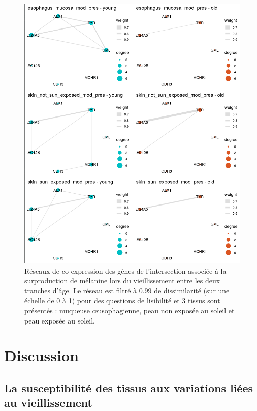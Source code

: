 \begin{figure}[p]
    \centering
    \includegraphics[width=1\textwidth]{img/chap2/chap2_graphs_intersection_melanine.png}
    \caption{Réseaux de co-expression des gènes de l'intersection associée à la surproduction de mélanine lors du vieillissement entre les deux tranches d'âge. Le réseau est filtré à 0.99 de dissimilarité (sur une échelle de 0 à 1) pour des questions de lisibilité et 3 tissus sont présentés : muqueuse œusophagienne, peau non exposée au soleil et peau exposée au soleil.}
    \label{figure:graphs_intersection_melanine}
\end{figure}


\section{Discussion}

\subsection{La susceptibilité des tissus aux variations liées au vieillissement}


